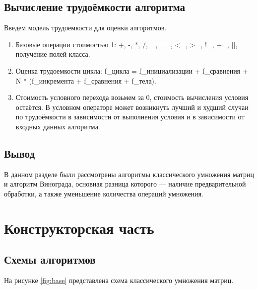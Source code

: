 \documentclass[12pt]{report}
\begin{document}
\section{Вычисление трудоёмкости алгоритма}
Введем модель трудоемкости для оценки алгоритмов.
\begin{enumerate}
	\item  Базовые операции стоимостью 1: +, -, *, /, =, ==, <=, >=, !=, +=, [], получение полей класса.
	\item Оценка трудоемкости цикла: f\_цикла = f\_инициализации + f\_сравнения + N * (f\_инкремента + f\_сравнения + f\_тела).
	\item Стоимость условного перехода возьмем за 0, стоимость вычисления условия остаётся. В условном операторе может возникнуть лучший и худший случаи по трудоёмкости в зависимости от выполнения условия и в зависимости от входных данных алгоритма.
\end{enumerate}

\section{Вывод}
	В данном разделе были рассмотрены алгоритмы классического умножения матриц и алгоритм Винограда, основная разница которого — наличие предварительной обработки, а также уменьшение количества операций умножения. 
	
\clearpage

\chapter{Конструкторская часть}

\section{Схемы алгоритмов}

На рисунке \ref{fig:base} представлена схема классического умножения матриц.
\end{document}
